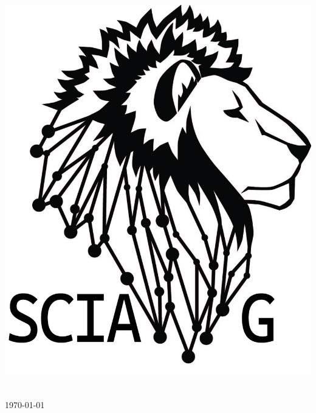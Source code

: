 \begin{titlepage}
\begin{center}
\includegraphics[scale=0.22]{./logo/sciag.jpeg}~\\


\vfill

{\large \today}


\end{center}
\end{titlepage}
